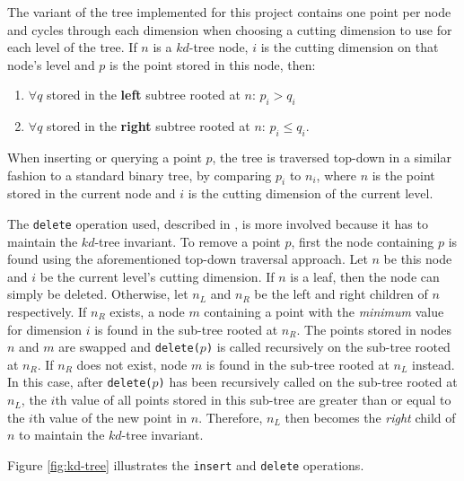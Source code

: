 The variant of the tree implemented for this project contains one point per node and cycles through each dimension when choosing a cutting dimension to use for each level of the tree. If $n$ is a $kd$-tree node, $i$ is the cutting dimension on that node's level and $p$ is the point stored in this node, then:
\begin{enumerate}
	\item $\forall q$ stored in the \textbf{left} subtree rooted at $n$: $p_i > q_i$ 
	\item $\forall q$ stored in the \textbf{right} subtree rooted at $n$: $p_i \leq q_i$.
\end{enumerate}
When inserting or querying a point $p$, the tree is traversed top-down in a similar fashion to a standard binary tree, by comparing $p_i$ to $n_i$, where $n$ is the point stored in the current node and $i$ is the cutting dimension of the current level.

The \texttt{delete} operation used, described in \cite{kdtree-remove}, is more involved because it has to maintain the $kd$-tree invariant. To remove a point $p$, first the node containing $p$ is found using the aforementioned top-down traversal approach. Let $n$ be this node and $i$ be the current level's cutting dimension. If $n$ is a leaf, then the node can simply be deleted. Otherwise, let $n_L$ and $n_R$ be the left and right children of $n$ respectively. If $n_R$ exists, a node $m$ containing a point with the \textit{minimum} value for dimension $i$ is found in the sub-tree rooted at $n_R$. The points stored in nodes $n$ and $m$ are swapped and \texttt{delete($p$)} is called recursively on the sub-tree rooted at $n_R$. If $n_R$ does not exist, node $m$ is found in the sub-tree rooted at $n_L$ instead. In this case, after \texttt{delete($p$)} has been recursively called on the sub-tree rooted at $n_L$, the $i$th value of all points stored in this sub-tree are greater than or equal to the $i$th value of the new point in $n$. Therefore, $n_L$ then becomes the \textit{right} child of $n$ to maintain the $kd$-tree invariant. 

Figure \ref{fig:kd-tree} illustrates the \texttt{insert} and \texttt{delete} operations.

